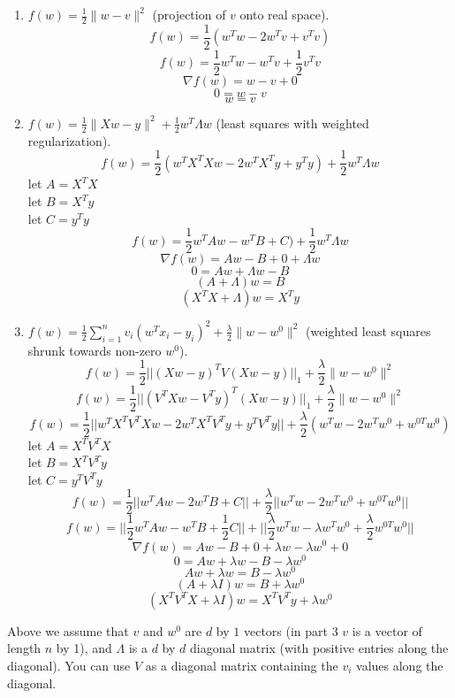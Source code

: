 \documentclass{article}
\def\blu#1{{\color{blu}#1}}
\def\norm#1{\|#1\|}
\def\ans#1{{\color{ans}#1}}
\def\half{\frac 1 2}
\def\enum#1{\begin{enumerate}#1\end{enumerate}}
\begin{document}
\blu{\enum{
\item $f(w) = \half \norm{w-v}^2$ (projection of $v$ onto real space).
\ans{
    \[
        f(w) = \half (w^Tw - 2w^Tv + v^Tv)
    \]
    \[
        f(w) = \half w^Tw - w^Tv + \half v^Tv
    \]
    \[
        \nabla f(w) = w - v + 0
    \]
    \[
        0 =  w - v
    \]
    \[
        w = v
    \]
}
\item $f(w)= \half \norm{Xw - y}^2 + \half w^T\Lambda w$ (least squares with weighted regularization).
\ans{
    \[
        f(w) = \half (w^TX^TXw - 2w^TX^Ty + y^Ty) + \half w^T \Lambda w
    \]
    let $A = X^TX$ \\
    let $B = X^Ty$ \\
    let $C = y^Ty$ \\
    \[
        f(w) = \half w^TAw - w^TB + C) + \half w^T \Lambda w
    \]
    \[
        \nabla f(w) = Aw - B + 0 + \Lambda w
    \]
    \[
        0 = Aw + \Lambda w - B
    \]
    \[
        (A + \Lambda )w = B
    \]
    \[
        (X^TX + \Lambda)w = X^Ty
    \]
}
\item $f(w) = \half \sum_{i=1}^n v_i (w^Tx_i - y_i)^2 + \frac{\lambda}{2}\norm{w-w^0}^2$ (weighted least squares shrunk towards non-zero $w^0$).
\ans{
    \[
        f(w) = \half || (Xw - y)^T V (Xw - y) ||_1 + \frac{\lambda}{2}\norm{w-w^0}^2
    \]
    \[
        f(w) = \half || (V^TXw - V^Ty)^T (Xw - y) ||_1 + \frac{\lambda}{2}\norm{w-w^0}^2
    \]
    \[
        f(w) = \half || w^T X^T V^T X w - 2w^T X^T V^T y + y^T V^T y || + \frac{\lambda}{2}(w^T w - 2w^T w^0 + w^{0T} w^0)
    \]
    let $A = X^T V^T X$\\
    let $B = X^T V^T y$\\
    let $C = y^T V^T y $\\
    \[
        f(w) = \half || w^T A w - 2w^T B + C || + \frac{\lambda}{2}||w^Tw - 2w^Tw^0 + w^{0T}w^0||
    \]
    \[
        f(w) = || \half w^T A w - w^T B + \half C || + ||\frac{\lambda}{2} w^Tw - \lambda w^Tw^0 + \frac{\lambda}{2} w^{0T}w^0||
    \]
    \[
        \nabla f(w) = Aw - B + 0 + \lambda w - \lambda w^0 + 0
    \]
    \[
        0 = Aw + \lambda w - B - \lambda w^0 
    \]
    \[
        Aw + \lambda w = B - \lambda w^0 
    \]
    \[ 
        (A + \lambda I) w = B + \lambda w^0
    \]
    \[
        (X^T V^T X + \lambda I) w = X^T V^T y + \lambda w^0
    \]
}
}}
Above we assume that $v$ and $w^0$ are $d$ by $1$ vectors (in part 3 $v$ is a vector of length $n$ by 1), and $\Lambda$ is a $d$ by $d$ diagonal matrix (with positive entries along the diagonal). You can use $V$ as a diagonal matrix containing the $v_i$ values along the diagonal.
\end{document}
